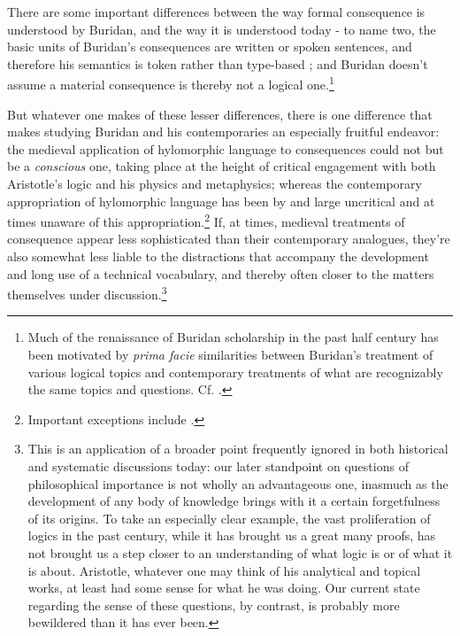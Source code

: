 \documentclass[]{article}
\begin{document}
		There are some important differences between the way formal consequence is understood by Buridan, and the way it is understood today - to name two, the basic units of Buridan's consequences are written or spoken sentences, and therefore his semantics is token rather than type-based \cite{Klima2004} \cite{DutilhNovaes2005}; and Buridan doesn't assume a material consequence is thereby not a logical one.\footnote{Much of the renaissance of Buridan scholarship in the past half century has been motivated by \textit{prima facie} similarities between Buridan's treatment of various logical topics and contemporary treatments of what are recognizably the same topics and questions. Cf. \cite{Moody1952} \cite{Bochenski1956} \cite{Kretzmann1982} \cite{Parsons2014}.}
		
		But whatever one makes of these lesser differences, there is one difference that makes studying Buridan and his contemporaries an especially fruitful endeavor: the medieval application of hylomorphic language to consequences could not but be a \textit{conscious} one, taking place at the height of critical engagement with both Aristotle's logic and his physics and metaphysics; whereas the contemporary appropriation of hylomorphic language has been by and large uncritical and at times unaware of this appropriation.\footnote{Important exceptions include \cite{Read1994} \cite{Read1995} \cite{MacFarlane2000} \cite{DutilhNovaes2011} \cite{DutilhNovaes2012a} \cite{DutilhNovaes2012b} \cite{DutilhNovaes2012c}.} If, at times, medieval treatments of consequence appear less sophisticated than their contemporary analogues, they're also somewhat less liable to the distractions that accompany the development and long use of a technical vocabulary, and thereby often closer to the matters themselves under discussion.\footnote{This is an application of a broader point frequently ignored in both historical and systematic discussions today: our later standpoint on questions of philosophical importance is not wholly an advantageous one, inasmuch as the development of any body of knowledge brings with it a certain forgetfulness of its origins. To take an especially clear example, the vast proliferation of logics in the past century, while it has brought us a great many proofs, has not brought us a step closer to an understanding of what logic is or of what it is about. Aristotle, whatever one may think of his analytical and topical works, at least had some sense for what he was doing. Our current state regarding the sense of these questions, by contrast, is probably more bewildered than it has ever been.}	
\end{document}
